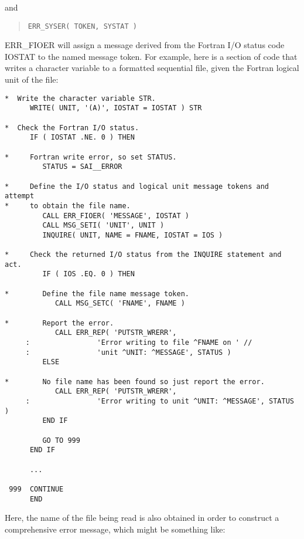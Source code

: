and

\begin {quote}
\begin {small}
\begin{verbatim}
ERR_SYSER( TOKEN, SYSTAT )
\end{verbatim}
\end {small}
\end {quote}

ERR\_FIOER will assign a message derived from
the Fortran I/O status code IOSTAT to the named message token. 
For example, here is a section of code that writes a character variable to a
formatted sequential file, given the Fortran logical unit of the file: 

\begin {small}
\begin{verbatim}
*  Write the character variable STR.
      WRITE( UNIT, '(A)', IOSTAT = IOSTAT ) STR

*  Check the Fortran I/O status.
      IF ( IOSTAT .NE. 0 ) THEN

*     Fortran write error, so set STATUS.
         STATUS = SAI__ERROR

*     Define the I/O status and logical unit message tokens and attempt 
*     to obtain the file name.
         CALL ERR_FIOER( 'MESSAGE', IOSTAT )
         CALL MSG_SETI( 'UNIT', UNIT )
         INQUIRE( UNIT, NAME = FNAME, IOSTAT = IOS )

*     Check the returned I/O status from the INQUIRE statement and act.
         IF ( IOS .EQ. 0 ) THEN

*        Define the file name message token.
            CALL MSG_SETC( 'FNAME', FNAME )

*        Report the error.
            CALL ERR_REP( 'PUTSTR_WRERR',
     :                'Error writing to file ^FNAME on ' //
     :                'unit ^UNIT: ^MESSAGE', STATUS )
         ELSE

*        No file name has been found so just report the error.
            CALL ERR_REP( 'PUTSTR_WRERR',
     :                'Error writing to unit ^UNIT: ^MESSAGE', STATUS )
         END IF

         GO TO 999
      END IF

      ...

 999  CONTINUE
      END
\end{verbatim}
\end {small}

Here, the name of the file being read is also obtained in order to construct 
a comprehensive error message, which might be something like:

